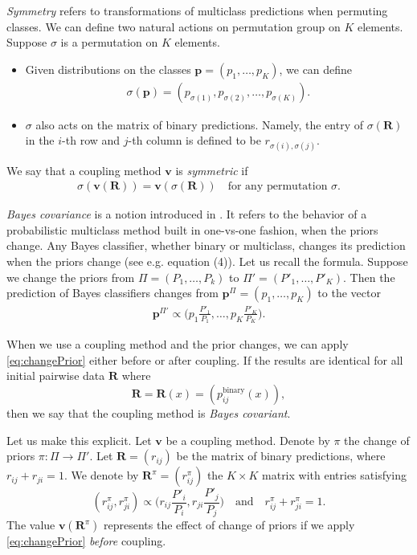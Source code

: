\documentclass[pdflatex, sn-basic]{sn-jnl}%
\theoremstyle{thmstyleone}%
\theoremstyle{thmstyletwo}%
\theoremstyle{thmstylethree}%
\begin{document}
\emph{Symmetry} refers to transformations of multiclass predictions when permuting classes. We can define two natural actions on permutation group on $K$ elements. Suppose $\sigma$ is a permutation on $K$ elements. 

\begin{itemize}
	\item Given  distributions on the classes $\boldsymbol{p}= (p_1, \ldots, p_K)$, we can define
	\begin{align}
		\sigma(\boldsymbol{p})= (p_{\sigma(1)},p_{\sigma(2)}, \ldots, p_{\sigma(K)}).
	\end{align}
	 \item $\sigma$ also acts on the matrix of binary predictions. Namely, the entry of $\sigma(\boldsymbol{R})$ in the $i$-th row and $j$-th column is defined to be $r_{\sigma(i), \sigma(j)}$.
	 \end{itemize}
We say that a coupling method $\boldsymbol{v}$ is \emph{symmetric} if 
\begin{align}
		\sigma(\boldsymbol{v}(\boldsymbol{R})) = \boldsymbol{v}(\sigma(\boldsymbol{R}))\quad\textrm{for any permutation $\sigma$}. \label{eq:symmetry}
\end{align}

\emph{Bayes covariance} is a notion introduced in  \cite{vsuch2016bayes}.
It refers to the behavior of a probabilistic multiclass method built in one-vs-one fashion, when the priors change. 
Any Bayes classifier, whether binary or multiclass, changes its prediction when the priors change (see e.g. \cite{saerens2002adjusting} equation (4)).  
Let us recall the formula. Suppose we change the priors from $\Pi = (P_1, \ldots, P_k)$ to $\Pi'= (P'_1, \ldots, P'_K)$. 
Then the prediction of Bayes classifiers changes from $\boldsymbol{p}^\Pi= (p_1, \ldots, p_K)$ to the vector 
\begin{align}
\boldsymbol{p}^{\Pi'} \propto \biggl(p_1 \frac{P'_1}{P_1}, \ldots, p_K \frac{P'_K}{P_K}\biggr). \label{eq:changePrior}
\end{align}

When we use a coupling method and the prior changes, we  can apply \eqref{eq:changePrior} either before or after coupling. If the results are identical for all initial pairwise data $\boldsymbol{R}$ where
$$\boldsymbol{R} = \boldsymbol{R}(x) = (p_{ij}^{\textrm{binary}}(x)),$$ 
then we say that the coupling method is \emph{Bayes covariant}. 

Let us make this explicit. Let $\boldsymbol{v}$ be a coupling method. Denote by  $\pi$ the change of priors $\pi:\Pi \rightarrow \Pi'$. Let $\boldsymbol{R}=(r_{ij})$ be the matrix of binary predictions, where $r_{ij}+r_{ji}=1$. We denote by $\boldsymbol{R}^\pi=(r^\pi_{ij})$ the $K\times K$ matrix with entries satisfying 
$$
(r^\pi_{ij}, r^\pi_{ji}) \propto \biggl(r_{ij}\frac{P'_i}{P_i}, r_{ji}\frac{P'_j}{P_j}\biggr)
\quad
\textrm{and}
\quad
r^\pi_{ij}+r^\pi_{ji} = 1.
$$
The value $\boldsymbol{v}(\boldsymbol{R}^\pi)$ represents the effect of change of priors if we apply \eqref{eq:changePrior} \emph{before} coupling.
\end{document}
